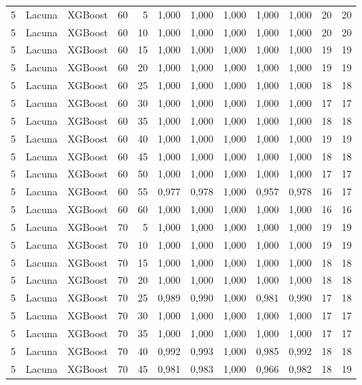 \begin{longtable}{@{}rllrrrrrrrrr@{}}
5 & Lacuna & XGBoost & 60 & 5 & 1,000 & 1,000 & 1,000 & 1,000 & 1,000 & 20 & 20 \\
5 & Lacuna & XGBoost & 60 & 10 & 1,000 & 1,000 & 1,000 & 1,000 & 1,000 & 20 & 20 \\
5 & Lacuna & XGBoost & 60 & 15 & 1,000 & 1,000 & 1,000 & 1,000 & 1,000 & 19 & 19 \\
5 & Lacuna & XGBoost & 60 & 20 & 1,000 & 1,000 & 1,000 & 1,000 & 1,000 & 19 & 19 \\
5 & Lacuna & XGBoost & 60 & 25 & 1,000 & 1,000 & 1,000 & 1,000 & 1,000 & 18 & 18 \\
5 & Lacuna & XGBoost & 60 & 30 & 1,000 & 1,000 & 1,000 & 1,000 & 1,000 & 17 & 17 \\
5 & Lacuna & XGBoost & 60 & 35 & 1,000 & 1,000 & 1,000 & 1,000 & 1,000 & 18 & 18 \\
5 & Lacuna & XGBoost & 60 & 40 & 1,000 & 1,000 & 1,000 & 1,000 & 1,000 & 19 & 19 \\
5 & Lacuna & XGBoost & 60 & 45 & 1,000 & 1,000 & 1,000 & 1,000 & 1,000 & 18 & 18 \\
5 & Lacuna & XGBoost & 60 & 50 & 1,000 & 1,000 & 1,000 & 1,000 & 1,000 & 17 & 17 \\
5 & Lacuna & XGBoost & 60 & 55 & 0,977 & 0,978 & 1,000 & 0,957 & 0,978 & 16 & 17 \\
5 & Lacuna & XGBoost & 60 & 60 & 1,000 & 1,000 & 1,000 & 1,000 & 1,000 & 16 & 16 \\
5 & Lacuna & XGBoost & 70 & 5 & 1,000 & 1,000 & 1,000 & 1,000 & 1,000 & 19 & 19 \\
5 & Lacuna & XGBoost & 70 & 10 & 1,000 & 1,000 & 1,000 & 1,000 & 1,000 & 19 & 19 \\
5 & Lacuna & XGBoost & 70 & 15 & 1,000 & 1,000 & 1,000 & 1,000 & 1,000 & 18 & 18 \\
5 & Lacuna & XGBoost & 70 & 20 & 1,000 & 1,000 & 1,000 & 1,000 & 1,000 & 18 & 18 \\
5 & Lacuna & XGBoost & 70 & 25 & 0,989 & 0,990 & 1,000 & 0,981 & 0,990 & 17 & 18 \\
5 & Lacuna & XGBoost & 70 & 30 & 1,000 & 1,000 & 1,000 & 1,000 & 1,000 & 17 & 17 \\
5 & Lacuna & XGBoost & 70 & 35 & 1,000 & 1,000 & 1,000 & 1,000 & 1,000 & 17 & 17 \\
5 & Lacuna & XGBoost & 70 & 40 & 0,992 & 0,993 & 1,000 & 0,985 & 0,992 & 18 & 18 \\
5 & Lacuna & XGBoost & 70 & 45 & 0,981 & 0,983 & 1,000 & 0,966 & 0,982 & 18 & 19 \\

\end{longtable}
